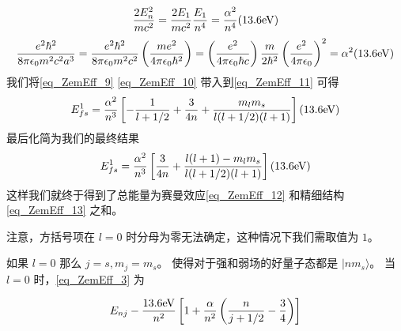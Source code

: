 \begin{equation}\label{eq_ZemEff_10}
\frac{2E_n^2}{mc^2}=\frac{2E_1}{mc^2}\frac{E_1}{n^4}=\frac{\alpha^2}{n^4}(13.6\rm{eV})
\end{equation}
\begin{equation}
\frac{e^2\hbar^2}{8\pi\epsilon_0m^2c^2a^3}=\frac{e^2\hbar^2}{8\pi\epsilon_0m^2c^2}\left(\frac{me^2}{4\pi\epsilon_0\hbar^2}\right)=\left(\frac{e^2}{4\pi\epsilon_0\hbar c}\right)\frac{m}{2\hbar^2}\left(\frac{e^2}{4\pi\epsilon_0}\right)^2=\alpha^2(13.6\rm{eV})
\end{equation}
我们将\autoref{eq_ZemEff_9} \autoref{eq_ZemEff_10} 带入到\autoref{eq_ZemEff_11} 可得
\begin{equation}\label{eq_ZemEff_13}
E_{fs}^1=\frac{\alpha^2}{n^3}\left[-\frac{1}{l+1/2}+\frac{3}{4n}+\frac{m_lm_s}{l(l+1/2)(l+1)}\right](13.6 \rm eV) 
\end{equation}
最后化简为我们的最终结果
\begin{equation}
E_{fs}^1=\frac{\alpha^2}{n^3}\left[\frac{3}{4n}+\frac{l(l+1)-m_lm_s}{l(l+1/2)(l+1)}\right](13.6 \rm eV)
\end{equation}
这样我们就终于得到了总能量为赛曼效应\autoref{eq_ZemEff_12} 和精细结构 \autoref{eq_ZemEff_13} 之和。

注意，方括号项在 $l=0$ 时分母为零无法确定，这种情况下我们需取值为 $1$。
\begin{example}{}
如果 $l=0$ 那么 $j=s,m_j=m_s$。 使得对于强和弱场的好量子态都是 $|nm_s\rangle$。 当 $l=0$ 时，\autoref{eq_ZemEff_3} 为

\begin{equation}
E_{nj}-\frac{13.6\rm{eV}}{n^2}\left[1+\frac{\alpha}{n^2}\left(\frac{n}{j+1/2}-\frac{3}{4}\right)\right]
\end{equation}

\end{example}

